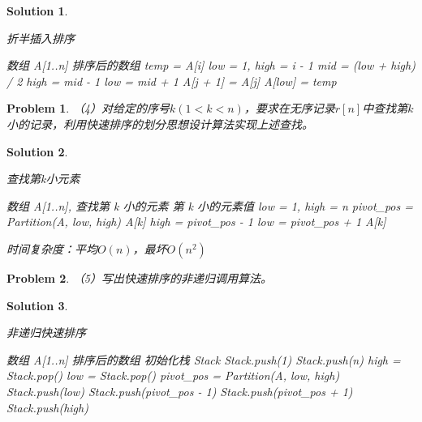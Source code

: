 \documentclass[12pt,a4paper]{amsart}
\newtheorem{problem}{Problem}[section]
\newtheorem{solution}{Solution}[section]
\begin{document}
\begin{solution}
\begin{algorithm}
\caption{折半插入排序}
\begin{algorithmic}[1]
\REQUIRE 数组 A[1..n]
\ENSURE 排序后的数组
\STATE temp = A[i]
\STATE low = 1, high = i - 1
\STATE mid = (low + high) / 2
\STATE high = mid - 1
\ELSE
\STATE low = mid + 1
\ENDIF
\ENDWHILE
{}
\STATE A[j + 1] = A[j]
\ENDFOR
\STATE A[low] = temp
\ENDFOR
\end{algorithmic}
\end{algorithm}
\end{solution}

\begin{problem}
（4）对给定的序号$k(1<k<n)$，要求在无序记录$r[n]$中查找第$k$小的记录，利用快速排序的划分思想设计算法实现上述查找。
\end{problem}

\begin{solution}
\begin{algorithm}
\caption{查找第k小元素}
\begin{algorithmic}[1]
\REQUIRE 数组 A[1..n], 查找第 k 小的元素
\ENSURE 第 k 小的元素值
\STATE low = 1, high = n
\STATE pivot\_pos = Partition(A, low, high)
\RETURN A[k]
\STATE high = pivot\_pos - 1
\ELSE
\STATE low = pivot\_pos + 1
\ENDIF
\ENDWHILE
\RETURN A[k]
\end{algorithmic}
\end{algorithm}

时间复杂度：平均$O(n)$，最坏$O(n^2)$
\end{solution}

\begin{problem}
（5）写出快速排序的非递归调用算法。
\end{problem}

\begin{solution}
\begin{algorithm}
\caption{非递归快速排序}
\begin{algorithmic}[1]
\REQUIRE 数组 A[1..n]
\ENSURE 排序后的数组
\STATE 初始化栈 Stack
\STATE Stack.push(1)
\STATE Stack.push(n)
\STATE high = Stack.pop()
\STATE low = Stack.pop()
\STATE pivot\_pos = Partition(A, low, high)
\STATE Stack.push(low)
\STATE Stack.push(pivot\_pos - 1)
\STATE Stack.push(pivot\_pos + 1)
\STATE Stack.push(high)
\ENDIF
\ENDWHILE
\end{algorithmic}
\end{algorithm}
\end{solution}
\end{document}
